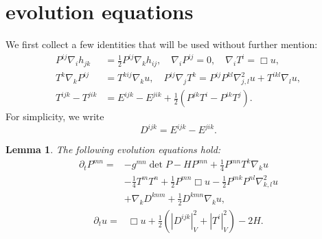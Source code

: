 \documentclass{amsart}
\newtheorem{lemma}[theorem]{Lemma}
\theoremstyle{definition}
\theoremstyle{remark}
\numberwithin{equation}{section}
\begin{document}
\section{evolution equations}
We first collect a few identities that will be used without further mention:
\begin{align}\label{equ: important1}
P^{ij}\nabla_ih_{jk}&=\frac{1}{2}P^{ij}\nabla_kh_{ij},\quad
\nabla_iP^{ij}=0,\quad \nabla_iT^i=\Box u,\\
T^k\nabla_kP^{ij}&=T^{kij}\nabla_ku,\quad P^{ij}\nabla_j T^k=P^{ij}P^{kl}\nabla^2_{j,l}u+T^{ikl}\nabla_lu,\\
T^{ijk}-T^{jik}&=E^{ijk}-E^{jik}+\frac{1}{2}\left(P^{jk}T^i-P^{ik}T^j\right).
\end{align}
For simplicity, we write
\[D^{ijk}=E^{ijk}-E^{jik}.\]
\begin{lemma}\label{ev u}
The following evolution equations hold:
\begin{align*}
\partial_tP^{mn}
=&-g^{mn}\det P-HP^{mn}+\frac{1}{4}P^{mn}T^k\nabla_ku\\
&-\frac{1}{4}T^mT^n+\frac{1}{2}P^{mn}\Box u-\frac{1}{2}P^{mk}P^{nl}\nabla^2_{k,l}u\\
&+\nabla_kD^{knm}+\frac{1}{2}D^{kmn}\nabla_ku,
\end{align*}
\begin{align*}
\partial_t u=&\Box u+\frac{1}{2}\left(\left|D^{ijk}\right|^2_V+\left|T^i\right|_V^2\right)-2H.
\end{align*}
\end{lemma}
\end{document}
